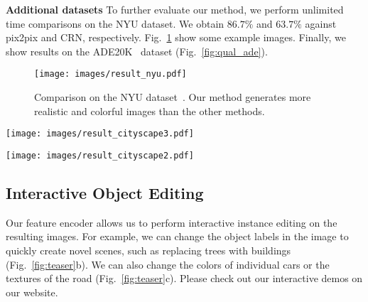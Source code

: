 \documentclass[10pt,twocolumn,letterpaper]{article}
\newcommand{\reffig}[1]{Fig.~\ref{fig:#1}}
\newcommand{\lblfig}[1]{\label{fig:#1}}
\newcommand{\lblsec}[1]{\label{sec:#1}}
\newcommand{\pp}{pix2pix\xspace}
\begin{document}
{\noindent \bf Additional datasets } To further evaluate our method, we perform unlimited time comparisons on the NYU dataset. We obtain $86.7\%$ and $63.7\%$ against \pp and CRN, respectively. \reffig{qual_nyu} show some example images. 
Finally, we show results on the ADE20K~\cite{zhou2017scene} dataset (\reffig{qual_ade}).

\begin{figure}
  \vspace{-.2in}
  \centering
  \texttt{[image: images/result\_nyu.pdf]}  
  \caption{Comparison on the NYU dataset~\cite{Silberman2012indoor}. Our method generates more realistic and colorful images than the other methods.}
  \lblfig{qual_nyu}
  \vspace{-.1in}
\end{figure}

\begin{figure*}
  \vspace{-.3in}
  \raggedleft
  \texttt{[image: images/result\_cityscape3.pdf]}  
  \vspace{-.1in}
  \caption{Comparison on the Cityscapes dataset~\cite{Cordts2016cityscapes} (label maps shown at the lower left corner in (a)). For both without and with VGG loss, our results are more realistic than the other two methods. Please zoom in for details.}
  \lblfig{qual_cityscape_both}
\end{figure*}

\begin{figure*}
  \vspace{-.1in}
  \raggedleft
  \texttt{[image: images/result\_cityscape2.pdf]}  
  \vspace{-.1in}
  \caption{Additional comparison results with CRN~\cite{chen2017photographic} on the Cityscapes dataset. Again, both our results have finer details in the synthesized cars, the trees, the buildings, etc. Please zoom in for details.}
  \lblfig{qual_cityscape}
  \vspace{-.15in}
\end{figure*}

\subsection{Interactive Object Editing} \lblsec{results:ui}
Our feature encoder allows us to perform interactive instance editing on the resulting images.
For example, we can change the object labels in the image to quickly create novel scenes, such as replacing trees with buildings (\reffig{teaser}b).
We can also change the colors of individual cars or the textures of the road (\reffig{teaser}c).
Please check out our interactive demos on our website.
\end{document}
